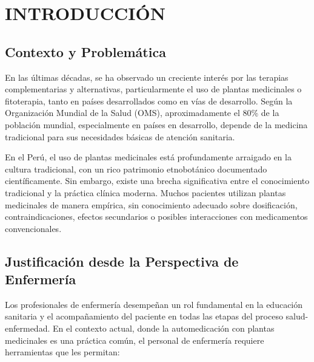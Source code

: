 \documentclass[12pt,a4paper]{article}
\begin{document}
\newpage
{}
\setcounter{page}{1}

\section{INTRODUCCIÓN}

\subsection{Contexto y Problemática}

En las últimas décadas, se ha observado un creciente interés por las terapias complementarias y alternativas, particularmente el uso de plantas medicinales o fitoterapia, tanto en países desarrollados como en vías de desarrollo\cite{WHO2019}. Según la Organización Mundial de la Salud (OMS), aproximadamente el 80\% de la población mundial, especialmente en países en desarrollo, depende de la medicina tradicional para sus necesidades básicas de atención sanitaria\cite{WHO2013}.

En el Perú, el uso de plantas medicinales está profundamente arraigado en la cultura tradicional, con un rico patrimonio etnobotánico documentado científicamente\cite{Bussmann2010}. Sin embargo, existe una brecha significativa entre el conocimiento tradicional y la práctica clínica moderna. Muchos pacientes utilizan plantas medicinales de manera empírica, sin conocimiento adecuado sobre dosificación, contraindicaciones, efectos secundarios o posibles interacciones con medicamentos convencionales\cite{Frenkel2005}.

\subsection{Justificación desde la Perspectiva de Enfermería}

Los profesionales de enfermería desempeñan un rol fundamental en la educación sanitaria y el acompañamiento del paciente en todas las etapas del proceso salud-enfermedad. En el contexto actual, donde la automedicación con plantas medicinales es una práctica común, el personal de enfermería requiere herramientas que les permitan:
\end{document}
